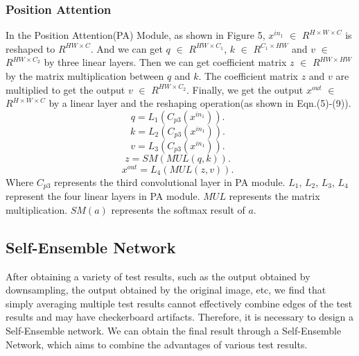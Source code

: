 \begin{sloppypar}
\subsubsection{Position Attention}
In the Position Attention(PA) Module, as shown in Figure 5, $x^{in_1}$ $\in$ $R^{H \times W \times C}$ is reshaped to $R^{HW \times C}$. And we can get $q$ $\in$ $R^{HW \times C_1}$, $k$ $\in$ $R^{C_1 \times HW}$ and $v$ $\in$ $R^{HW \times C_2}$ by three linear layers. Then we can get coefficient matrix $z$ $\in$ $R^{HW \times HW}$ by the matrix multiplication between $q$ and $k$. The coefficient matrix $z$ and $v$ are multiplied to get the output $v$ $\in$ $R^{HW \times C_2}$. Finally, we get the output $x^{out}$ $\in$ $R^{H \times W \times C}$ by a linear layer and the reshaping operation(as shown in Eqn.(5)-(9)).
\begin{equation}
	    q  =  L_1(C_{p3}(x^{in_1})). \enspace
\end{equation}
\begin{equation}
	    k  =  L_2(C_{p3}(x^{in_1})). \enspace
\end{equation}
\begin{equation}
	    v  =  L_3(C_{p3}(x^{in_1})). \enspace
\end{equation}
\begin{equation}
	    z  =  SM(MUL(q, k)). \enspace
\end{equation}
\begin{equation}
	    x^{out}  =  L_4(MUL(z, v)). \enspace
\end{equation}
Where $C_{p3}$ represents the third convolutional layer in PA module. $L_1$, $L_2$, $L_3$, $L_4$ represent the four linear layers in PA module. $MUL$ represents the matrix multiplication. $SM(a)$ represents the softmax result of $a$.
\subsection{Self-Ensemble Network}

After obtaining a variety of test results, such as the output obtained by downsampling, the output obtained by the original image, etc, we find that simply averaging multiple test results cannot effectively combine edges of the test results and may have checkerboard artifacts. Therefore, it is necessary to design a Self-Ensemble network. We can obtain the final result through a Self-Ensemble Network, which aims to combine the advantages of various test results.


\end{sloppypar}
